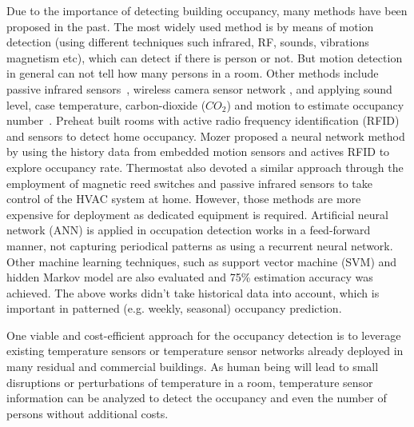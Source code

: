 Due to the importance of detecting building occupancy, many methods have been
proposed in the past. The most widely used method is by means of motion
detection (using different techniques such infrared, RF, sounds, vibrations
magnetism etc), which can detect if there is person or not. But motion
detection in general can not tell how many persons in a room.  Other methods
include passive infrared sensors~\cite{Dodier2006Building}, wireless camera
sensor network \cite{erickson2009energy}, and applying sound level, case
temperature, carbon-dioxide ($CO_2$) and motion to estimate occupancy
number~\cite{Ekwevugbe2013Real}.  Preheat \cite{scott2011ctrl} built rooms with
active radio frequency identification (RFID) and sensors to detect home
occupancy. Mozer \cite{mozer1997neurothermostat} proposed a neural network
method by using the history data from embedded motion sensors and actives RFID
to explore occupancy rate. Thermostat \cite{lu2010smartthermostat} also devoted
a similar approach through the employment of magnetic reed switches and passive
infrared sensors to take control of the HVAC system at home. However, those
methods are more expensive for deployment as dedicated equipment is required.
Artificial neural network (ANN) is applied in occupation detection works
\cite{lam2009occupancy} in a feed-forward manner, not capturing periodical
patterns as using a recurrent neural network. Other machine learning
techniques, such as support vector machine (SVM) and hidden Markov model are
also evaluated and 75\% estimation accuracy was achieved. The above works didn't
take historical data into account, which is important in patterned (e.g.
weekly, seasonal) occupancy prediction.

One viable and cost-efficient  approach for the occupancy detection is to leverage
existing temperature sensors or temperature sensor networks already
deployed in many residual and commercial buildings. As human being
will lead to small disruptions or perturbations of temperature in a
room, temperature sensor information can be analyzed to detect the
occupancy and even the number of persons without additional costs.


